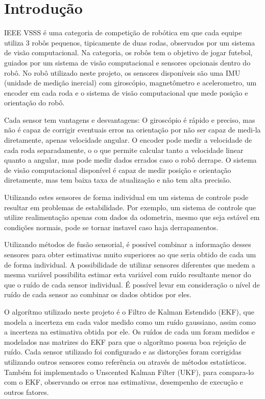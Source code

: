 \documentclass[
	12pt,				%
	openright,			%
	twoside,			%
	convert,
	a4paper,			%
	english,			%
	french,				%
	spanish,			%
	brazil				%
	]{abntex2}
\begin{document}
\listoffigures*
\cleardoublepage


\tableofcontents*
\cleardoublepage



\textual


\chapter{Introdução}
IEEE VSSS é uma categoria de competição de robótica em que cada equipe utiliza 3 robôs pequenos, tipicamente de duas rodas, observados por um sistema de visão computacional. Na categoria, os robôs tem o objetivo de jogar futebol, guiados por um sistema de visão computacional e sensores opcionais dentro do robô. No robô utilizado neste projeto, os sensores disponíveis são uma IMU (unidade de medição inercial) com giroscópio, magnetômetro e acelerometro, um encoder em cada roda e o sistema de visão computacional que mede posição e orientação do robô.
\par
Cada sensor tem vantagens e desvantagens: O giroscópio é rápido e preciso, mas não é capaz de corrigir eventuais erros na orientação por não ser capaz de medi-la diretamente, apenas velocidade angular. O encoder pode medir a velocidade de cada roda separadamente, o o que permite calcular tanto a velocidade linear quanto a angular, mas pode medir dados errados caso o robô derrape. O sistema de visão computacional disponível é capaz de medir posição e orientação diretamente, mas tem baixa taxa de atualização e não tem alta precisão.
\par
Utilizando estes sensores de forma individual em um sistema de controle pode resultar em problemas de estabilidade. Por exemplo, um sistema de controle que utilize realimentação apenas com dados da odometria, mesmo que seja estável em condições normais, pode se tornar instavel caso haja derrapamentos.
\par
Utilizando métodos de fusão sensorial, é possível combinar a informação desses sensores para obter estimativas muito superiores ao que seria obtido de cada um de forma individual. A possibilidade de utilizar sensores diferentes que medem a mesma variável possibilita estimar esta variável com ruído resultante menor do que o ruído de cada sensor individual. É possível levar em consideração o nível de ruído de cada sensor ao combinar os dados obtidos por eles.
\par
O algorítmo utilizado neste projeto é o Filtro de Kalman Estendido (EKF), que modela a incerteza em cada valor medido como um ruído gaussiano, assim como a incerteza na estimativa obtida por ele. Os ruídos de cada um foram medidos e modelados nas matrizes do EKF para que o algorítmo possua boa rejeição de ruído. Cada sensor utilizado foi configurado e as distorções foram corrigidas utilizando outros sensores como referência ou através de métodos estatísticos. Também foi implementado o Unscented Kalman Filter (UKF), para compara-lo com o EKF, observando os erros nas estimativas, desempenho de execução e outros fatores.
\end{document}
